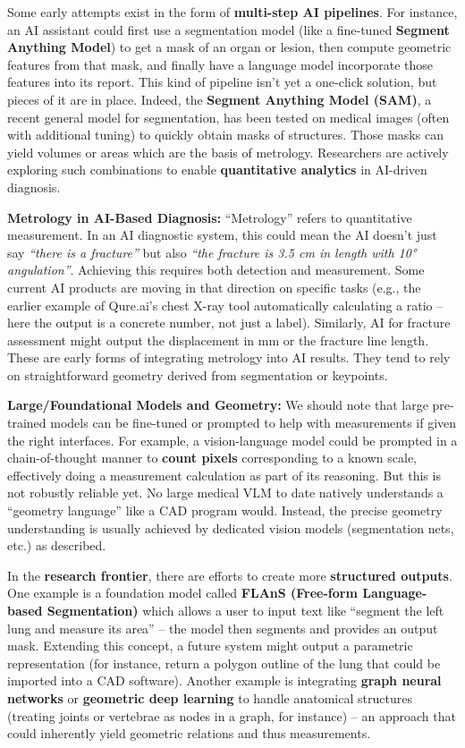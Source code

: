 \documentclass[
]{article}
\begin{document}
Some early attempts exist in the form of \textbf{multi-step AI
pipelines}. For instance, an AI assistant could first use a segmentation
model (like a fine-tuned \textbf{Segment Anything Model}) to get a mask
of an organ or lesion, then compute geometric features from that mask,
and finally have a language model incorporate those features into its
report. This kind of pipeline isn't yet a one-click solution, but pieces
of it are in place. Indeed, the \textbf{Segment Anything Model (SAM)}, a
recent general model for segmentation, has been tested on medical images
(often with additional tuning) to quickly obtain masks of structures.
Those masks can yield volumes or areas which are the basis of metrology.
Researchers are actively exploring such combinations to enable
\textbf{quantitative analytics} in AI-driven diagnosis.

\textbf{Metrology in AI-Based Diagnosis:} ``Metrology'' refers to
quantitative measurement. In an AI diagnostic system, this could mean
the AI doesn't just say \emph{``there is a fracture''} but also
\emph{``the fracture is 3.5 cm in length with 10° angulation''}.
Achieving this requires both detection and measurement. Some current AI
products are moving in that direction on specific tasks (e.g., the
earlier example of Qure.ai's chest X-ray tool automatically calculating
a
ratio\cite{key-36}
-- here the output is a concrete number, not just a label). Similarly,
AI for fracture assessment might output the displacement in mm or the
fracture line length. These are early forms of integrating metrology
into AI results. They tend to rely on straightforward geometry derived
from segmentation or keypoints.

\textbf{Large/Foundational Models and Geometry:} We should note that
large pre-trained models can be fine-tuned or prompted to help with
measurements if given the right interfaces. For example, a
vision-language model could be prompted in a chain-of-thought manner to
\textbf{count pixels} corresponding to a known scale, effectively doing
a measurement calculation as part of its reasoning. But this is not
robustly reliable yet. No large medical VLM to date natively understands
a ``geometry language'' like a CAD program would. Instead, the precise
geometry understanding is usually achieved by dedicated vision models
(segmentation nets, etc.) as described.

In the \textbf{research frontier}, there are efforts to create more
\textbf{structured outputs}. One example is a foundation model called
\textbf{FLAnS (Free-form Language-based Segmentation)} which allows a
user to input text like ``segment the left lung and measure its area''
-- the model then segments and provides an output
mask\cite{key-39}.
Extending this concept, a future system might output a parametric
representation (for instance, return a polygon outline of the lung that
could be imported into a CAD software). Another example is integrating
\textbf{graph neural networks} or \textbf{geometric deep learning} to
handle anatomical structures (treating joints or vertebrae as nodes in a
graph, for instance) -- an approach that could inherently yield
geometric relations and thus
measurements\cite{key-40}\cite{key-41}.
\end{document}
